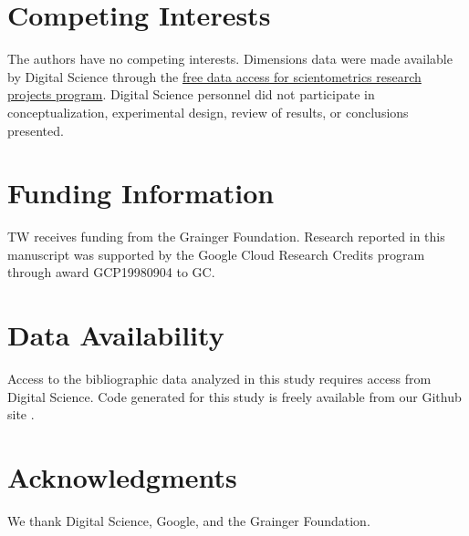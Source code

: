 \documentclass[12pt, oneside]{article}   	%
\begin{document}
\section*{Competing Interests} \vspace{3mm} The authors have no competing interests. Dimensions data were made available by Digital Science through the \href{http://www.dimensions.ai/scientometric-research/.}{free data access for scientometrics research projects program}. Digital Science personnel did not participate in conceptualization, experimental design, review of results, or conclusions presented. 

\section*{Funding Information} TW receives funding from the Grainger Foundation. Research reported in this manuscript was supported by the Google Cloud Research Credits program through award GCP19980904 to GC.

\section*{Data Availability} Access to the bibliographic data analyzed in this study requires access from Digital Science. Code generated for this study is freely available from our Github site \citep{Park2021}.

\section*{Acknowledgments} We thank Digital Science, Google, and the Grainger Foundation.



\end{document}
